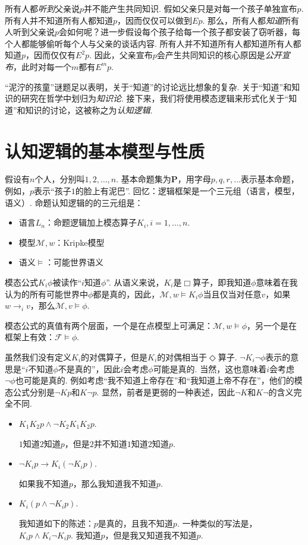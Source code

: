 所有人都\emph{听到}父亲说$p$并不能产生共同知识. 假如父亲只是对每一个孩子单独宣布$p$. 所有人并不知道所有人都知道$p$，因而仅仅可以做到$E p$. 那么，所有人都\emph{知道}所有人听到父亲说$p$会如何呢？进一步假设每个孩子给每一个孩子都安装了窃听器，每个人都能够偷听每个人与父亲的谈话内容. 所有人并不知道所有人都知道所有人都知道$p$，因而仅仅有$E^2 p$. 因此，父亲宣布$p$会产生共同知识的核心原因是\emph{公开宣布}，此时对每一个$m$都有$E^m p$.

“泥泞的孩童”谜题足以表明，关于“知道”的讨论远比想象的复杂. 关于“知道”和知识的研究在哲学中划归为\emph{知识论}. 接下来，我们将使用模态逻辑来形式化关于“知道”和知识的讨论，这被称之为\emph{认知逻辑}.


\section{认知逻辑的基本模型与性质}

假设有$n$个人，分别叫$1,2,\dots,n$. 基本命题集为$\mathbf P$，用字母$p,q,r,\dots$表示基本命题，例如，$p$表示“孩子$1$的脸上有泥巴”. 回忆：逻辑框架是一个三元组（语言，模型，语义）. 命题认知逻辑的的三元组是：
\begin{itemize}
    \item 语言$L_n$：命题逻辑加上模态算子$K_i,i=1,\dots,n$.
    \item 模型$\mathcal M,w$：Kripke模型
    \item 语义$\vDash$：可能世界语义
\end{itemize}

模态公式$K_i\phi$被读作“$i$知道$\phi$”. 从语义来说，$K_i$是$\Box$算子，即我知道$\phi$意味着在我认为的所有可能世界中$\phi$都是真的，因此，$\mathcal M,w\vDash K_i\phi$当且仅当对任意$v$，如果$w\to_i v$，那么$\mathcal M,v\vDash\phi$.

模态公式的真值有两个层面，一个是在点模型上可满足：$\mathcal M,w\vDash\phi$，另一个是在框架上有效：$\mathcal F\vDash\phi$.

虽然我们没有定义$K_i$的对偶算子，但是$K_i$的对偶相当于$\Diamond$算子. $\neg K_i\neg\phi$表示的意思是“$i$不知道$\phi$不是真的”，因此$i$会考虑$\phi$可能是真的. 当然，这也意味着$i$会考虑$\neg\phi$也可能是真的. 例如考虑“我不知道上帝存在”和“我知道上帝不存在”，他们的模态公式分别是$\neg Kp$和$K\neg p$. 显然，前者是更弱的一种表述，因此$\neg K$和$K\neg$的含义完全不同.

\begin{example}
\begin{itemize}
    \item $K_1K_2p\wedge \neg K_2K_1K_2 p$.
    
    $1$知道$2$知道$p$，但是$2$并不知道$1$知道$2$知道$p$.
    
    \item $\neg K_i p\to K_i(\neg K_i p)$.
    
    如果我不知道$p$，那么我知道我不知道$p$.
    
    \item $K_i(p\wedge\neg K_i p)$.
    
    我知道如下的陈述：$p$是真的，且我不知道$p$. 一种类似的写法是，$K_ip\wedge K_i\neg K_ip$. 我知道$p$，但是我又知道我不知道$p$.
\end{itemize}
\end{example}

